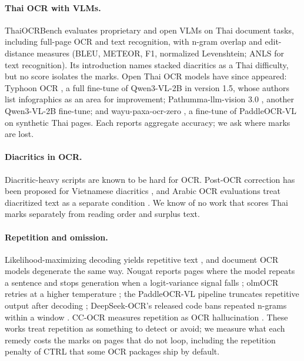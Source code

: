 \documentclass[10pt,twocolumn]{article}
\begin{document}
\paragraph{Thai OCR with VLMs.} ThaiOCRBench \citep{nonesung2025thaiocrbench} evaluates proprietary and open VLMs on Thai document tasks, including full-page OCR and text recognition, with n-gram overlap and edit-distance measures (BLEU, METEOR, F1, normalized Levenshtein; ANLS for text recognition). Its introduction names stacked diacritics as a Thai difficulty, but no score isolates the marks. Open Thai OCR models have since appeared: Typhoon OCR \citep{nonesung2026typhoonocr}, a full fine-tune of Qwen3-VL-2B \citep{bai2025qwen3vl} in version 1.5, whose authors list infographics as an area for improvement; Pathumma-llm-vision 3.0 \citep{nectec2026pathumma}, another Qwen3-VL-2B fine-tune; and wayu-paxa-ocr-zero \citep{pipatanakul2026synthetic}, a fine-tune of PaddleOCR-VL \citep{cui2025paddleocrvl} on synthetic Thai pages. Each reports aggregate accuracy; we ask where marks are lost.

\paragraph{Diacritics in OCR.} Diacritic-heavy scripts are known to be hard for OCR. Post-OCR correction has been proposed for Vietnamese diacritics \citep{do2025reference}, and Arabic OCR evaluations treat diacritized text as a separate condition \citep{elsafty2025arabic}. We know of no work that scores Thai marks separately from reading order and surplus text.

\paragraph{Repetition and omission.} Likelihood-maximizing decoding yields repetitive text \citep{holtzman2020curious}, and document OCR models degenerate the same way. Nougat reports pages where the model repeats a sentence and stops generation when a logit-variance signal falls \citep{blecher2024nougat}; olmOCR retries at a higher temperature \citep{poznanski2025olmocr}; the PaddleOCR-VL pipeline truncates repetitive output after decoding \citep{paddlex2025truncate}; DeepSeek-OCR's released code bans repeated n-grams within a window \citep{deepseekocr2025code,wei2025deepseekocr}. CC-OCR measures repetition as OCR hallucination \citep{yang2025ccocr}. These works treat repetition as something to detect or avoid; we measure what each remedy costs the marks on pages that do not loop, including the repetition penalty of CTRL \citep{keskar2019ctrl} that some OCR packages ship by default.
\end{document}
